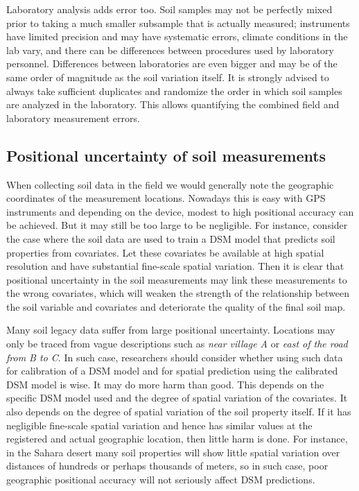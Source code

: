 \documentclass[10pt,b5paper,]{book}
\theoremstyle{definition}
\theoremstyle{definition}
\theoremstyle{definition}
\theoremstyle{remark}
\begin{document}
Laboratory analysis adds error too. Soil samples may not be perfectly
mixed prior to taking a much smaller subsample that is actually
measured; instruments have limited precision and may have systematic
errors, climate conditions in the lab vary, and there can be differences
between procedures used by laboratory personnel. Differences between
laboratories are even bigger and may be of the same order of magnitude
as the soil variation itself. It is strongly advised to always take
sufficient duplicates and randomize the order in which soil samples are
analyzed in the laboratory. This allows quantifying the combined field
and laboratory measurement errors.

\hypertarget{positional-uncertainty-of-soil-measurements}{%
\subsection{Positional uncertainty of soil
measurements}\label{positional-uncertainty-of-soil-measurements}}

When collecting soil data in the field we would generally note the
geographic coordinates of the measurement locations. Nowadays this is
easy with GPS instruments and depending on the device, modest to high
positional accuracy can be achieved. But it may still be too large to be
negligible. For instance, consider the case where the soil data are used
to train a DSM model that predicts soil properties from covariates. Let
these covariates be available at high spatial resolution and have
substantial fine-scale spatial variation. Then it is clear that
positional uncertainty in the soil measurements may link these
measurements to the wrong covariates, which will weaken the strength of
the relationship between the soil variable and covariates and
deteriorate the quality of the final soil map.

Many soil legacy data suffer from large positional uncertainty.
Locations may only be traced from vague descriptions such as \emph{near
village A} or \emph{east of the road from B to C}. In such case,
researchers should consider whether using such data for calibration of a
DSM model and for spatial prediction using the calibrated DSM model is
wise. It may do more harm than good. This depends on the specific DSM
model used and the degree of spatial variation of the covariates. It
also depends on the degree of spatial variation of the soil property
itself. If it has negligible fine-scale spatial variation and hence has
similar values at the registered and actual geographic location, then
little harm is done. For instance, in the Sahara desert many soil
properties will show little spatial variation over distances of hundreds
or perhaps thousands of meters, so in such case, poor geographic
positional accuracy will not seriously affect DSM predictions.
\end{document}
